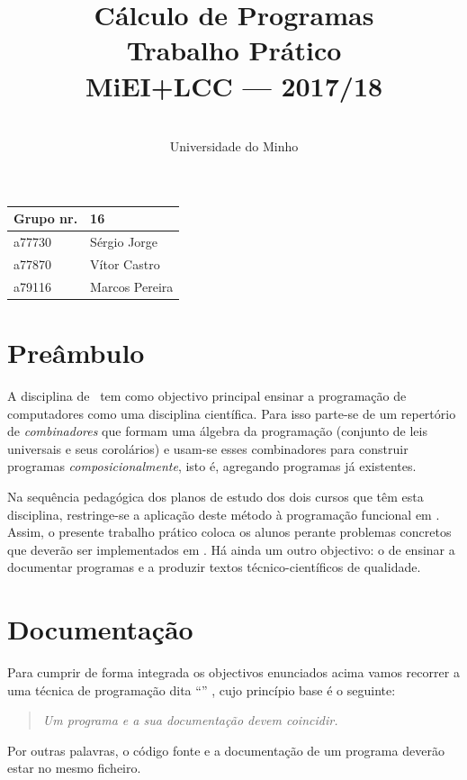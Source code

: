 \documentclass[a4paper]{article}
\title{
       	    Cálculo de Programas
\\
       	Trabalho Prático
\\
       	MiEI+LCC --- 2017/18
}
\author{
       	\dium
\\
       	Universidade do Minho
}
\date\mydate
\begin{document}
\maketitle

\begin{center}\large
\begin{tabular}{ll}
\textbf{Grupo} nr. & 16
\\\hline
a77730 & Sérgio Jorge
\\
a77870 & Vítor Castro
\\
a79116 & Marcos Pereira
\end{tabular}
\end{center}

\section{Preâmbulo}

A disciplina de \CP\ tem como objectivo principal ensinar
a progra\-mação de computadores como uma disciplina científica. Para isso
parte-se de um repertório de \emph{combinadores} que formam uma álgebra da
programação (conjunto de leis universais e seus corolários) e usam-se esses
combinadores para construir programas \emph{composicionalmente}, isto é,
agregando programas já existentes.

Na sequência pedagógica dos planos de estudo dos dois cursos que têm esta
disciplina, restringe-se a aplicação deste método à programação funcional
em \Haskell. Assim,
o presente trabalho prático coloca os alunos perante problemas
concretos que deverão ser implementados em \Haskell.
Há ainda um outro objectivo: o de ensinar a documentar programas e
a produzir textos técnico-científicos de qualidade.

\section{Documentação}
Para cumprir de forma integrada os objectivos enunciados acima vamos recorrer
a uma técnica de programa\-ção dita ``'' \cite{Kn92}, cujo
princípio base é o seguinte:
\begin{quote}\em
Um programa e a sua documentação devem coincidir.
\end{quote}
Por outras palavras, o código fonte e a documentação de um programa deverão estar no
mesmo ficheiro.
\end{document}
